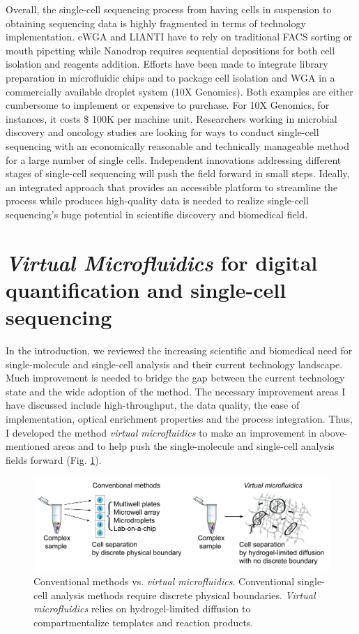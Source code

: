 Overall, the single-cell sequencing process from having cells in suspension to obtaining sequencing data is highly fragmented in terms of technology implementation. eWGA and LIANTI have to rely on traditional FACS sorting or mouth pipetting while Nanodrop requires sequential depositions for both cell isolation and reagents addition. Efforts have been made to integrate library preparation in microfluidic chips \cite{Kim:2017gy} and to package cell isolation and WGA in a commercially available droplet system (10X Genomics). Both examples are either cumbersome to implement or expensive to purchase. For 10X Genomics, for instances, it costs \$ 100K per machine unit. Researchers working in microbial discovery and oncology studies are looking for ways to conduct single-cell sequencing with an economically reasonable and technically manageable method for a large number of single cells. Independent innovations addressing different stages of single-cell sequencing will push the field forward in small steps. Ideally, an integrated approach that provides an accessible platform to streamline the process while produces high-quality data is needed to realize single-cell sequencing's huge potential in scientific discovery and biomedical field. 

\section{\textbf{\textit{Virtual Microfluidics}} for
digital quantification and single-cell sequencing}
In the introduction, we reviewed the increasing scientific and biomedical need for single-molecule and single-cell analysis and their current technology landscape. Much improvement is needed to bridge the gap between the current technology state and the wide adoption of the method. The necessary improvement areas I have discussed include high-throughput, the data quality, the ease of implementation, optical enrichment properties and the process integration. Thus, I developed the method \textit{virtual microfluidics} to make an improvement in above-mentioned areas and to help push the single-molecule and single-cell analysis fields forward (Fig. \ref{fig:VM1}). 

\begin{figure}[ht!]
\centering
\includegraphics[keepaspectratio,width=1\textwidth]{./figures/Thesis-20.png}
\caption[Conventional methods vs. \textit{virtual microfluidics}]{Conventional methods vs. \textit{virtual microfluidics}. Conventional single-cell analysis methods
require discrete physical boundaries. \textit{Virtual microfluidics} relies on hydrogel-limited diffusion to compartmentalize templates and reaction products.}
\label{fig:VM1}
\end{figure}

